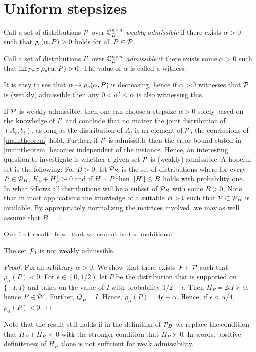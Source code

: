 \documentclass{article}
\begin{document}
\section{Uniform stepsizes}
\begin{definition}
Call a set of distributions $\P$ over $\C_B^{\ncn}$
\emph{weakly admissible} if there exists $\alpha>0$ such that
$\rhos{P}>0$ holds for all $P\in \P$.
\end{definition}
\begin{definition}
Call a set of distributions $\P$ over $\C_B^{\ncn}$ \emph{admissible}
if there exists some $\alpha>0$ such that $\inf_{P\in \P} \rhos{P}>0$.
The value of $\alpha$ is called a witness.
\end{definition}
It is easy to see that $\alpha \mapsto \rhos{P}$ is decreasing,
hence if $\alpha>0$ witnesses that $\P$ is (weakly) admissible
then any $0<\alpha'\le \alpha$ is also witnessing this.

If $\P$ is weakly admissible, then one can choose a stepsize $\alpha>0$ solely based on the knowledge of $\P$ and
conclude that no matter the joint distribution of $(A_t,b_t)$, as long as the distribution of $A_t$ is an element of $\P$, the conclusions of \cref{maintheorem} hold. Further, if $\P$ is admissible then the error bound stated in  \cref{maintheorem} becomes independent of the instance.
Hence, an interesting question to investigate is whether a given set $\P$ is (weakly) admissible.
A hopeful set is the following:
For $B>0$, let $\P_B$ is the set of distributions where for every $P\in \P_B$, $H_P+H_P^\top\succ 0$
and if $H\sim P$ then $\norm{H}\le B$ holds with probability one.
In what follows all distributions will be a subset of $\P_B$ with some $B>0$,
Note that in most applications the knowledge of a suitable $B>0$ such that $\P\subset \P_B$ is available.
By appropriately normalizing the matrices involved, we may as well assume that $B=1$.

Our first result shows that we cannot be too ambitious:
\begin{proposition}
The set $\P_1$ is not weakly admissible.
\end{proposition}
\begin{proof}
Fix an arbitrary $\alpha>0$. We show that there exists $P\in \P$ such that $\rho_\alpha(P)<0$.
For $\epsilon \in (0,1/2)$ let $P$ be the distribution that is supported on $\{-I,I\}$ and takes on the value of $I$ with probability $1/2+\epsilon$. Then $H_P = 2\epsilon I \succ 0$, hence $P\in \P_1$. Further, $Q_P = I$.
Hence, $\rho_\alpha(P) = 4\epsilon-\alpha$. Hence, if $\epsilon<\alpha/4$, $\rho_\alpha(P)<0$.
\end{proof}
Note that the result still holds if in the definition of $\P_B$ we replace the condition that $H_P + H_P^\top \succ 0$ with the
stronger condition that $H_P\succ 0$. In words, positive definiteness of $H_P$ alone is not sufficient for weak admissibility.
\end{document}
